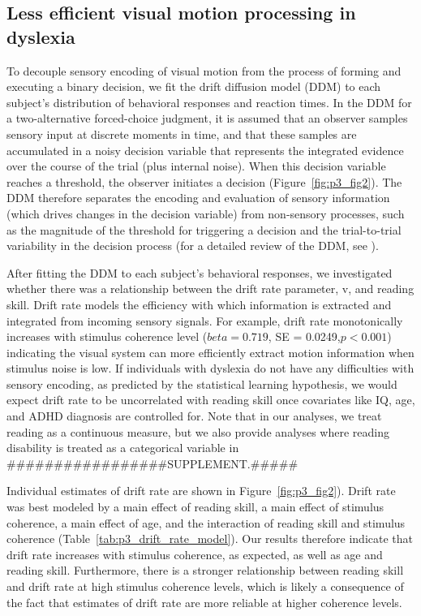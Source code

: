 \documentclass[../uwthesis.tex]{subfiles}
\begin{document}
\subsection{Less efficient visual motion processing in dyslexia}
To decouple sensory encoding of visual motion from the process of forming and executing a binary decision, we fit the drift diffusion model (DDM) to each subject’s distribution of behavioral responses and reaction times. In the DDM for a two-alternative forced-choice judgment, it is assumed that an observer samples sensory input at discrete moments in time, and that these samples are accumulated in a noisy decision variable that represents the integrated evidence over the course of the trial (plus internal noise). When this decision variable reaches a threshold, the observer initiates a decision (Figure~\ref{fig:p3_fig2}). The DDM therefore separates the encoding and evaluation of sensory information (which drives changes in the decision variable) from non-sensory processes, such as the magnitude of the threshold for triggering a decision and the trial-to-trial variability in the decision process (for a detailed review of the DDM, see \cite{Ratcliff2004ATask,Ratcliff2008TheTasks}).

After fitting the DDM to each subject’s behavioral responses, we investigated whether
there was a relationship between the drift rate parameter, v, and reading skill. Drift rate models the efficiency with which information is extracted and integrated from incoming sensory signals. For example, drift rate monotonically increases with stimulus coherence level ($beta = 0.719$, SE = 0.0249,$p<0.001$) indicating the visual system can more efficiently extract motion information when stimulus noise is low. If individuals with dyslexia do not have any difficulties with sensory encoding, as predicted by the statistical learning hypothesis, we would expect drift rate to be uncorrelated with reading skill once covariates like IQ, age, and ADHD diagnosis are controlled for. Note that in our analyses, we treat reading as a continuous measure, but we also provide
analyses where reading disability is treated as a categorical variable in #################SUPPLEMENT.##### 

Individual estimates of drift rate are shown in Figure~\ref{fig:p3_fig2}). Drift rate was best modeled by a main effect of reading skill, a main effect of stimulus coherence, a main effect of age, and the interaction of reading skill and stimulus coherence (Table~\ref{tab:p3_drift_rate_model}). Our results therefore indicate that drift rate increases with stimulus coherence, as expected, as well as age and reading skill. Furthermore, there is a stronger relationship between reading skill and drift rate at high stimulus coherence levels, which is likely a consequence of the fact that estimates of drift rate are more reliable at higher coherence levels.
\end{document}
